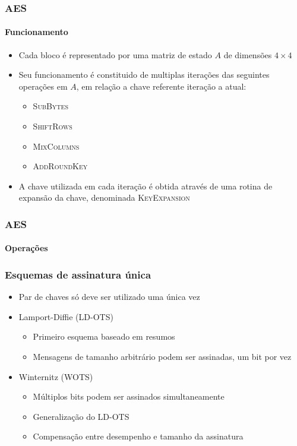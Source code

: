 \documentclass[12pt]{beamer}
\begin{document}
\begin{frame}
    \frametitle{AES}
    \framesubtitle{Funcionamento}
    \begin{itemize}
        \item Cada bloco é representado por uma matriz de estado $A$ de dimensões $4 \times 4$
        \item Seu funcionamento é constituido de multiplas iterações das seguintes operações em $A$, em relação a chave referente iteração a atual:
        \begin{itemize}
            \item\textsc{SubBytes}
            \item\textsc{ShiftRows}
            \item\textsc{MixColumns}
            \item\textsc{AddRoundKey}
        \end{itemize}
        \item A chave utilizada em cada iteração é obtida através de uma rotina de expansão da chave, denominada \textsc{KeyExpansion}
    \end{itemize}
\end{frame}

\begin{frame}
    \frametitle{AES}
    \framesubtitle{Operações}
    
\end{frame}

\begin{frame}
  \frametitle{Esquemas de assinatura única}
  \begin{itemize}
    \item Par de chaves só deve ser utilizado uma única vez
    \item Lamport-Diffie (LD-OTS)
    \begin{itemize}
      \item Primeiro esquema baseado em resumos
      \item Mensagens de tamanho arbitrário podem ser assinadas, um bit por vez
    \end{itemize}
    \item Winternitz (WOTS)
    \begin{itemize}
      \item Múltiplos bits podem ser assinados simultaneamente
      \item Generalização do LD-OTS
      \item Compensação entre desempenho e tamanho da assinatura
    \end{itemize}
  \end{itemize}
\end{frame}
\end{document}
